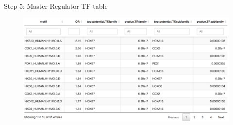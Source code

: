 \documentclass[slidestop,compress,11pt,xcolor=dvipsnames]{beamer}
\begin{document}
\begin{frame}{Step 5: Master Regulator TF table}
 \vspace{-0.5cm}
 \begin{figure}
  \hspace*{-0.5cm}
  \includegraphics[width=1.1\linewidth]{ELMER/TF_tbl.png}
 \end{figure}
\end{frame}
\end{document}

